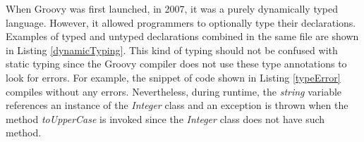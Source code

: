 \documentclass[]{sigplanconf}
\begin{document}
% 
% 
% 
% 

When Groovy was first launched, in 2007, it was a purely dynamically typed language.
However, it allowed programmers to optionally type their declarations.
Examples of typed and untyped declarations combined in the same file are shown in Listing \ref{dynamicTyping}.
This kind of typing should not be confused with static typing since the Groovy compiler does not use these type annotations to look for errors.
For example, the snippet of code shown in Listing \ref{typeError} compiles without any errors.
Nevertheless, during runtime, the \emph{string} variable references an instance of the \emph{Integer} class and an exception is thrown when the method \emph{toUpperCase} is invoked since the \emph{Integer} class does not have such method.
\end{document}
